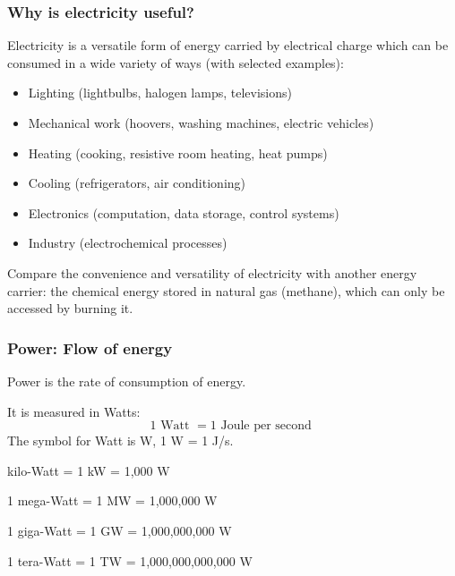 \documentclass[10pt,aspectratio=169,dvipsnames]{beamer}
\let\olditem\item
\renewcommand{\item}{%
\olditem\vspace{5pt}}
\begin{document}
\begin{frame}
  \frametitle{Why is electricity useful?}

  Electricity is a versatile form of energy carried by electrical
  charge which can be consumed in a wide variety of ways (with selected examples):
  \begin{itemize}
  \item Lighting (lightbulbs, halogen lamps, televisions)
  \item Mechanical work (hoovers, washing machines, electric vehicles)
  \item Heating (cooking, resistive room heating, heat pumps)
  \item Cooling (refrigerators, air conditioning)
  \item Electronics (computation, data storage, control systems)
  \item Industry (electrochemical processes)
  \end{itemize}

  Compare the convenience and versatility of electricity with another
  energy carrier: the chemical energy stored in natural gas (methane),
  which can only be accessed by burning it.

\end{frame}



\begin{frame}
  \frametitle{Power: Flow of energy}

  \alert{Power} is the rate of consumption of energy.

  It is measured in \alert{Watts}:
  \begin{equation*}
     1 \textrm{ Watt } = 1 \textrm{ Joule per second }
  \end{equation*}
  The symbol for Watt is W, 1 W = 1 J/s.

   kilo-Watt = 1 kW = 1,000 W

  1 mega-Watt = 1 MW = 1,000,000 W

  1 giga-Watt = 1 GW = 1,000,000,000 W

  1 tera-Watt = 1 TW = 1,000,000,000,000 W


\end{frame}
\end{document}
